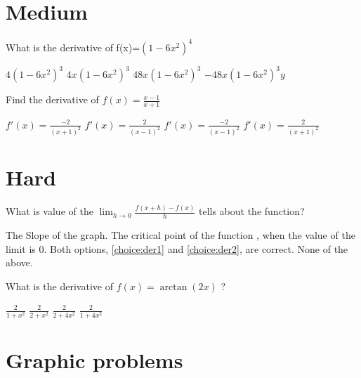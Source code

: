 \documentclass{exam}
\begin{document}
\section{Medium}


\begin{questions}

	\question What is the derivative of f(x)=$(1-6x^2)^4$
	\begin{choices}
		\choice $4(1-6x^2)^3$
		\choice $4x(1-6x^2)^3$
		\choice $48x(1-6x^2)^3$
		\CorrectChoice $-48x(1-6x^2)^3 y$
	\end{choices}

	\question Find the derivative of $f(x) = \frac{x-1}{x+1}$

	\begin{choices}
		\choice $f'(x) = \frac{-2}{(x+1)^2}$
		\choice $f'(x) = \frac{2}{(x-1)^2}$
		\choice $f'(x) = \frac{-2}{(x-1)^2}$
		\CorrectChoice $f'(x) = \frac{2}{(x+1)^2}$
	\end{choices}

\end{questions}



\section{Hard}

\begin{questions}

	\question What is value of the $\displaystyle \lim_{h \to 0} \frac{f(x+h) -f(x)}{h}$ tells about the function?

	\begin{choices}
		\choice\label{choice:der1} The Slope of the graph.
		\choice\label{choice:der2} The critical point of the function , when the value of the limit is 0.
		\CorrectChoice Both options, \ref{choice:der1} and \ref{choice:der2}, are correct.
		\choice None of the above.
	\end{choices}

	\question What is the derivative of $f(x) = \arctan(2x)$ ?

	\begin{choices}
		\choice $\frac{2}{1 + x^{2}}$
		\choice $\frac{2}{2 + x^{2}}$
		\choice $\frac{2}{2 + 4x^{2}}$
		\CorrectChoice $\frac{2}{1 + 4x^{2}}$
	\end{choices}

\end{questions}

\section{Graphic problems}
\end{document}
